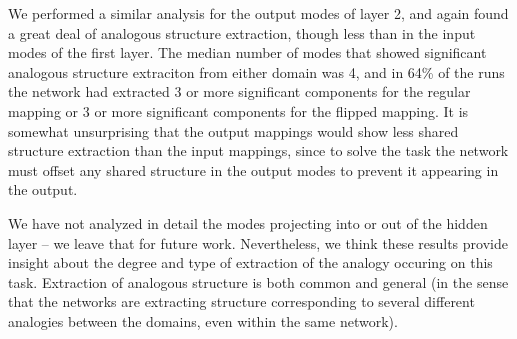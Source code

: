 \documentclass[10pt,letterpaper]{article}
\begin{document}
We performed a similar analysis for the output modes of layer 2, and again found a great deal of analogous structure extraction, though less than in the input modes of the first layer. The median number of modes that showed significant analogous structure extraciton from either domain was 4, and in 64\% of the runs the network had extracted 3 or more significant components for the regular mapping or 3 or more significant components for the flipped mapping. It is somewhat unsurprising that the output mappings would show less shared structure extraction than the input mappings, since to solve the task the network must offset any shared structure in the output modes to prevent it appearing in the output. \par  
We have not analyzed in detail the modes projecting into or out of the hidden layer -- we leave that for future work. Nevertheless, we think these results provide insight about the degree and type of extraction of the analogy occuring on this task. Extraction of analogous structure is both common and general (in the sense that the networks are extracting structure corresponding to several different analogies between the domains, even within the same network).
\end{document}
